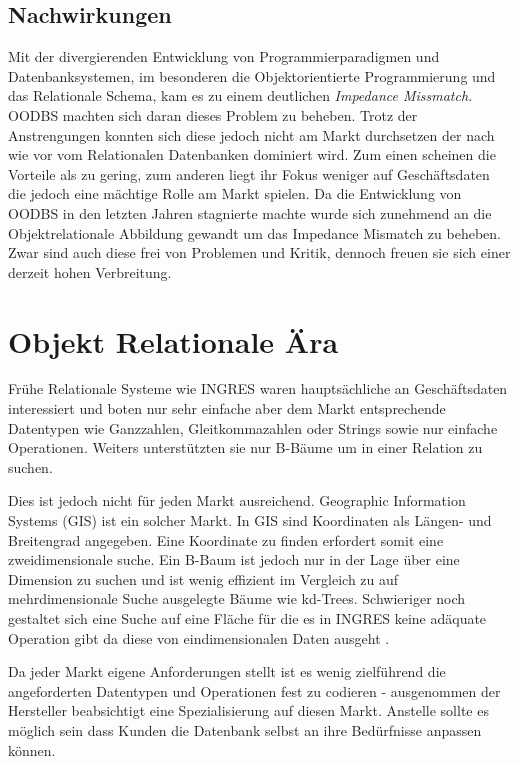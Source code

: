


\subsection{Nachwirkungen}
Mit der divergierenden Entwicklung von Programmierparadigmen und Datenbanksystemen, im besonderen die Objektorientierte Programmierung und das Relationale Schema, kam es zu einem deutlichen \emph{Impedance Missmatch}. 
OODBS machten sich daran dieses Problem zu beheben. Trotz der Anstrengungen konnten sich diese jedoch nicht am Markt durchsetzen der nach wie vor vom Relationalen Datenbanken dominiert wird. Zum einen scheinen die Vorteile als zu gering, zum anderen liegt ihr Fokus weniger auf Geschäftsdaten die jedoch eine mächtige Rolle am Markt spielen.
Da die Entwicklung von OODBS in den letzten Jahren stagnierte machte wurde sich zunehmend an die Objektrelationale Abbildung gewandt um das Impedance Mismatch zu beheben. Zwar sind auch diese frei von Problemen und Kritik, dennoch freuen sie sich einer derzeit hohen Verbreitung.


\section{Objekt Relationale Ära}

Frühe Relationale Systeme wie INGRES waren hauptsächliche an Geschäftsdaten interessiert und boten nur sehr einfache aber dem Markt entsprechende Datentypen wie Ganzzahlen, Gleitkommazahlen oder Strings sowie nur einfache Operationen. Weiters unterstützten sie nur B-Bäume um in einer Relation zu suchen.

Dies ist jedoch nicht für jeden Markt ausreichend. Geographic Information Systems (GIS) ist ein solcher Markt. In GIS sind Koordinaten als Längen- und Breitengrad angegeben. Eine Koordinate zu finden erfordert somit eine zweidimensionale suche. Ein B-Baum ist jedoch nur in der Lage über eine Dimension zu suchen und ist wenig effizient im Vergleich zu auf mehrdimensionale Suche ausgelegte Bäume wie kd-Trees. Schwieriger noch gestaltet sich eine Suche auf eine Fläche für die es in INGRES keine adäquate Operation gibt da diese von eindimensionalen Daten ausgeht \cite{stonebraker2005}.

Da jeder Markt eigene Anforderungen stellt ist es wenig zielführend die angeforderten Datentypen und Operationen fest zu codieren - ausgenommen der Hersteller beabsichtigt eine Spezialisierung auf diesen Markt. Anstelle sollte es möglich sein dass Kunden die Datenbank selbst an ihre Bedürfnisse anpassen können.


